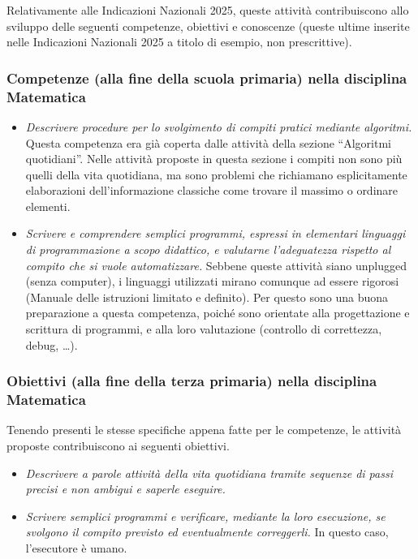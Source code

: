 Relativamente alle Indicazioni Nazionali 2025, queste attività contribuiscono allo sviluppo delle seguenti competenze, obiettivi e conoscenze (queste ultime inserite nelle Indicazioni Nazionali 2025 a titolo di esempio, non prescrittive).


\subsubsection{Competenze (alla fine della scuola primaria) nella disciplina Matematica}


\begin{itemize}
\item
  \emph{Descrivere procedure per lo svolgimento di compiti pratici mediante algoritmi.} Questa competenza era già coperta dalle attività della sezione ``Algoritmi quotidiani''. Nelle attività proposte in questa sezione i compiti non sono più quelli della vita quotidiana, ma sono problemi che richiamano esplicitamente elaborazioni dell'informazione classiche come trovare il massimo o ordinare elementi.

\item
  \emph{Scrivere e comprendere semplici programmi, espressi in elementari linguaggi di programmazione a scopo didattico, e valutarne l'adeguatezza rispetto al compito che si vuole automatizzare.} Sebbene queste attività siano unplugged (senza computer), i linguaggi utilizzati mirano comunque ad essere rigorosi (Manuale delle istruzioni limitato e definito). Per questo sono una buona preparazione a questa competenza, poiché sono orientate alla progettazione e scrittura di programmi, e alla loro valutazione (controllo di correttezza, debug, \ldots).

\end{itemize}






\subsubsection{Obiettivi (alla fine della terza primaria) nella disciplina Matematica}

Tenendo presenti le stesse specifiche appena fatte per le competenze, le attività proposte contribuiscono ai seguenti obiettivi.


\begin{itemize}
\item
  \emph{Descrivere a parole attività della vita quotidiana tramite sequenze di passi precisi e non ambigui e saperle eseguire.}
\item
  \emph{Scrivere semplici programmi e verificare, mediante la loro esecuzione, se svolgono il compito previsto ed eventualmente correggerli.} In questo caso, l'esecutore è umano.
\end{itemize}

